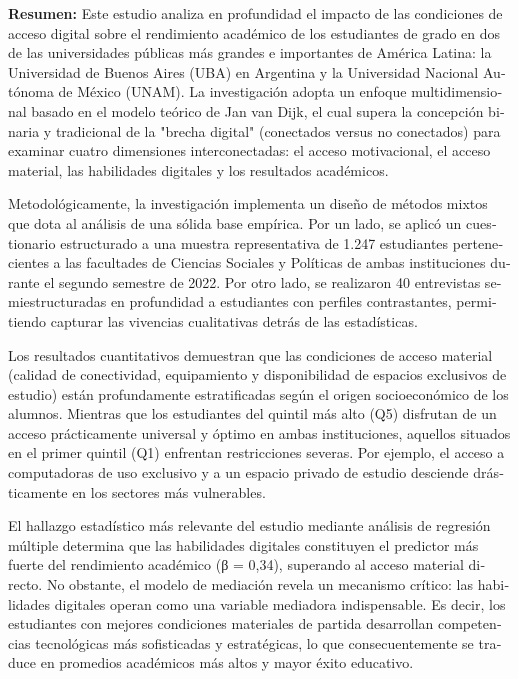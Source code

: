 \begin{tcolorbox}[colback=brown!8!white,colframe=brown!8!white,boxrule=0pt,arc=2pt,left=4pt,right=4pt,top=3pt,bottom=3pt,before skip=4pt,after skip=4pt]
\begin{otherlanguage}{spanish}
\sffamily\small \textbf{Resumen:} Este estudio analiza en profundidad el impacto de las condiciones de acceso digital sobre el rendimiento académico de los estudiantes de grado en dos de las universidades públicas más grandes e importantes de América Latina: la Universidad de Buenos Aires (UBA) en Argentina y la Universidad Nacional Autónoma de México (UNAM). La investigación adopta un enfoque multidimensional basado en el modelo teórico de Jan van Dijk, el cual supera la concepción binaria y tradicional de la "brecha digital" (conectados versus no conectados) para examinar cuatro dimensiones interconectadas: el acceso motivacional, el acceso material, las habilidades digitales y los resultados académicos.

Metodológicamente, la investigación implementa un diseño de métodos mixtos que dota al análisis de una sólida base empírica. Por un lado, se aplicó un cuestionario estructurado a una muestra representativa de 1.247 estudiantes pertenecientes a las facultades de Ciencias Sociales y Políticas de ambas instituciones durante el segundo semestre de 2022. Por otro lado, se realizaron 40 entrevistas semiestructuradas en profundidad a estudiantes con perfiles contrastantes, permitiendo capturar las vivencias cualitativas detrás de las estadísticas.

Los resultados cuantitativos demuestran que las condiciones de acceso material (calidad de conectividad, equipamiento y disponibilidad de espacios exclusivos de estudio) están profundamente estratificadas según el origen socioeconómico de los alumnos. Mientras que los estudiantes del quintil más alto (Q5) disfrutan de un acceso prácticamente universal y óptimo en ambas instituciones, aquellos situados en el primer quintil (Q1) enfrentan restricciones severas. Por ejemplo, el acceso a computadoras de uso exclusivo y a un espacio privado de estudio desciende drásticamente en los sectores más vulnerables.

El hallazgo estadístico más relevante del estudio mediante análisis de regresión múltiple determina que las habilidades digitales constituyen el predictor más fuerte del rendimiento académico (β = 0,34), superando al acceso material directo. No obstante, el modelo de mediación revela un mecanismo crítico: las habilidades digitales operan como una variable mediadora indispensable. Es decir, los estudiantes con mejores condiciones materiales de partida desarrollan competencias tecnológicas más sofisticadas y estratégicas, lo que consecuentemente se traduce en promedios académicos más altos y mayor éxito educativo.


\end{otherlanguage}
\end{tcolorbox}
